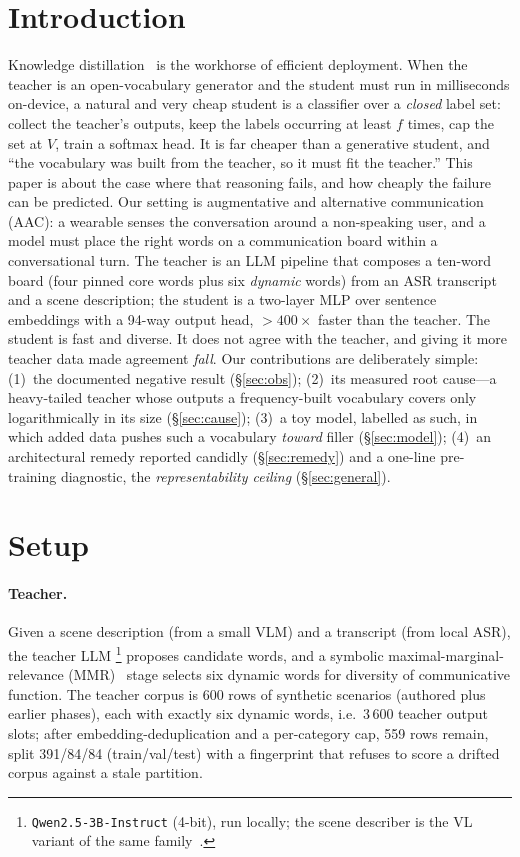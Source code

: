 \documentclass{article}
\begin{document}
\section{Introduction}
Knowledge distillation~\citep{hinton2015} is the workhorse of efficient
deployment. When the teacher is an open-vocabulary generator and the student
must run in milliseconds on-device, a natural and very cheap student is a
classifier over a \emph{closed} label set: collect the teacher's outputs, keep
the labels occurring at least $f$ times, cap the set at $V$, train a softmax
head. It is far cheaper than a generative student, and ``the vocabulary was
built from the teacher, so it must fit the teacher.'' This paper is about the
case where that reasoning fails, and how cheaply the failure can be predicted.
Our setting is augmentative and alternative communication (AAC): a wearable
senses the conversation around a non-speaking user, and a model must place the
right words on a communication board within a conversational turn. The teacher is an LLM pipeline that
composes a ten-word board (four pinned core words plus six \emph{dynamic}
words) from an ASR transcript and a scene description; the student is a
two-layer MLP over sentence embeddings with a 94-way output head, ${>}400\times$
faster than the teacher. The student is fast and diverse. It does not agree
with the teacher, and giving it more teacher data made agreement \emph{fall}.
Our contributions are deliberately simple: (1)~the documented negative result
(\S\ref{sec:obs}); (2)~its measured root cause---a heavy-tailed teacher whose
outputs a frequency-built vocabulary covers only logarithmically in its size
(\S\ref{sec:cause}); (3)~a toy model, labelled as such, in which added data
pushes such a vocabulary \emph{toward} filler (\S\ref{sec:model}); (4)~an
architectural remedy reported candidly (\S\ref{sec:remedy}) and a one-line
pre-training diagnostic, the \emph{representability ceiling}
(\S\ref{sec:general}).

\section{Setup}
\label{sec:setup}
\paragraph{Teacher.} Given a scene description (from a small VLM) and a
transcript (from local ASR), the teacher LLM%
\footnote{\texttt{Qwen2.5-3B-Instruct} (4-bit), run locally; the scene
describer is the VL variant of the same family~\citep{qwen25vl}.}
proposes candidate words, and a symbolic maximal-marginal-relevance
(MMR)~\citep{mmr1998} stage selects six dynamic words for diversity of
communicative function. The teacher corpus is 600 rows of synthetic scenarios
(authored plus earlier phases), each with exactly six dynamic words, i.e.\
$3\,600$ teacher output slots; after embedding-deduplication and a per-category
cap, 559 rows remain, split 391/84/84 (train/val/test) with a fingerprint that
refuses to score a drifted corpus against a stale partition.
\end{document}
